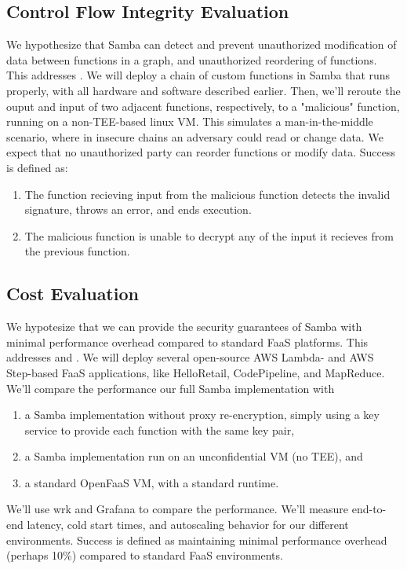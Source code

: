 \subsection{Control Flow Integrity Evaluation}
We hypothesize that Samba can detect and prevent unauthorized modification of data between functions in a graph, and unauthorized reordering of functions.
This addresses .
We will deploy a chain of custom functions in Samba that runs properly, with all hardware and software described earlier.
Then, we'll reroute the ouput and input of two adjacent functions, respectively, to a "malicious" function, running on a non-TEE-based linux VM.
This simulates a man-in-the-middle scenario, where in insecure chains an adversary could read or change data.
We expect that no unauthorized party can reorder functions or modify data. Success is defined as:
\begin{enumerate}
    \item The function recieving input from the malicious function detects the invalid signature, throws an error, and ends execution.
    \item The malicious function is unable to decrypt any of the input it recieves from the previous function.
\end{enumerate}

\subsection{Cost Evaluation}
We hypotesize that we can provide the security guarantees of Samba with minimal performance overhead compared to standard FaaS platforms.
This addresses  and .
We will deploy several open-source AWS Lambda- and AWS Step-based FaaS applications, like HelloRetail, CodePipeline, and MapReduce.
We'll compare the performance our full Samba implementation with
\begin{enumerate}
\item a Samba implementation without proxy re-encryption, simply using a key service to provide each function with the same key pair,
\item a Samba implementation run on an unconfidential VM (no TEE), and
\item a standard OpenFaaS VM, with a standard runtime.
\end{enumerate}
We'll use wrk and Grafana to compare the performance.
We'll measure end-to-end latency, cold start times, and autoscaling behavior for our different environments.
Success is defined as maintaining minimal performance overhead (perhaps 10\%) compared to standard FaaS environments.
